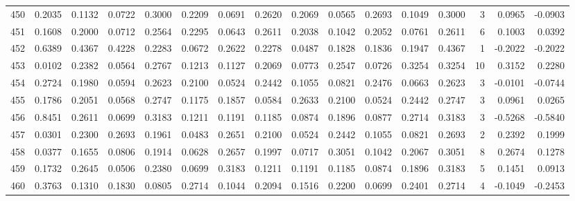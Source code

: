\begin{tabular}{lrrrrrrrrrrrrrrr}
450 &      0.2035 &  0.1132 &  0.0722 &  0.3000 &  0.2209 &  0.0691 &  0.2620 &  0.2069 &  0.0565 &  0.2693 &   0.1049 &     0.3000 &      3 &                    0.0965 &                    -0.0903 \\
451 &      0.1608 &  0.2000 &  0.0712 &  0.2564 &  0.2295 &  0.0643 &  0.2611 &  0.2038 &  0.1042 &  0.2052 &   0.0761 &     0.2611 &      6 &                    0.1003 &                     0.0392 \\
452 &      0.6389 &  0.4367 &  0.4228 &  0.2283 &  0.0672 &  0.2622 &  0.2278 &  0.0487 &  0.1828 &  0.1836 &   0.1947 &     0.4367 &      1 &                   -0.2022 &                    -0.2022 \\
453 &      0.0102 &  0.2382 &  0.0564 &  0.2767 &  0.1213 &  0.1127 &  0.2069 &  0.0773 &  0.2547 &  0.0726 &   0.3254 &     0.3254 &     10 &                    0.3152 &                     0.2280 \\
454 &      0.2724 &  0.1980 &  0.0594 &  0.2623 &  0.2100 &  0.0524 &  0.2442 &  0.1055 &  0.0821 &  0.2476 &   0.0663 &     0.2623 &      3 &                   -0.0101 &                    -0.0744 \\
455 &      0.1786 &  0.2051 &  0.0568 &  0.2747 &  0.1175 &  0.1857 &  0.0584 &  0.2633 &  0.2100 &  0.0524 &   0.2442 &     0.2747 &      3 &                    0.0961 &                     0.0265 \\
456 &      0.8451 &  0.2611 &  0.0699 &  0.3183 &  0.1211 &  0.1191 &  0.1185 &  0.0874 &  0.1896 &  0.0877 &   0.2714 &     0.3183 &      3 &                   -0.5268 &                    -0.5840 \\
457 &      0.0301 &  0.2300 &  0.2693 &  0.1961 &  0.0483 &  0.2651 &  0.2100 &  0.0524 &  0.2442 &  0.1055 &   0.0821 &     0.2693 &      2 &                    0.2392 &                     0.1999 \\
458 &      0.0377 &  0.1655 &  0.0806 &  0.1914 &  0.0628 &  0.2657 &  0.1997 &  0.0717 &  0.3051 &  0.1042 &   0.2067 &     0.3051 &      8 &                    0.2674 &                     0.1278 \\
459 &      0.1732 &  0.2645 &  0.0506 &  0.2380 &  0.0699 &  0.3183 &  0.1211 &  0.1191 &  0.1185 &  0.0874 &   0.1896 &     0.3183 &      5 &                    0.1451 &                     0.0913 \\
460 &      0.3763 &  0.1310 &  0.1830 &  0.0805 &  0.2714 &  0.1044 &  0.2094 &  0.1516 &  0.2200 &  0.0699 &   0.2401 &     0.2714 &      4 &                   -0.1049 &                    -0.2453 \\

\end{tabular}
